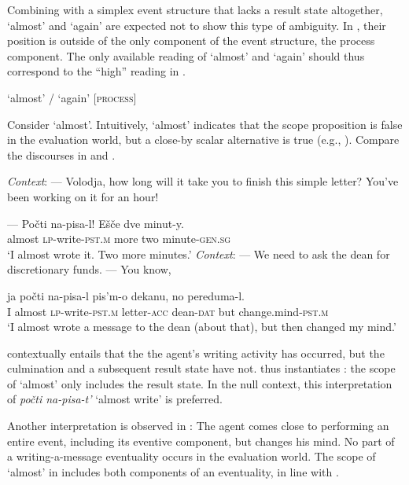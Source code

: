 \documentclass[output=paper,colorlinks,citecolor=brown]{langscibook}
\begin{document}
\noindent Combining with a simplex event structure that lacks a result state altogether, ‘almost’ and ‘again’ are expected not to show this type of ambiguity. In , their position is outside of the only component of the event structure, the process component. The only available reading of ‘almost’ and ‘again’ should thus correspond to the “high” reading in .

\ea    ‘almost’ / ‘again’ [\textsc{process}]\label{tat:ex:39}
\z

\noindent Consider ‘almost’. Intuitively, ‘almost’ indicates that the scope proposition is false in the evaluation world, but a close-by scalar alternative is true (e.g., \citealt{Penka2006}). Compare the discourses in  and .

\ea\label{tat:ex:40}
\eanoraggedright  \textit{Context}: — Volodja, how long will it take you to finish this simple letter? You’ve been working on it for an hour!\label{ex:tatevosov:40a}

\gll   —  Počti na-pisa-l!  Ešče  dve  minut-y.\\
    {} almost  \textsc{lp}-write-\textsc{pst.m}  more  two  minute-\textsc{gen.sg}\\
\glt  ‘I almost wrote it. Two more minutes.’
\ex     \textit{Context}: — We need to ask the dean for discretionary funds. — You know,

\gll    ja  počti na-pisa-l  pis’m-o  dekanu,  no pereduma-l.\\
    I  almost   \textsc{lp}-write-\textsc{pst.m}  letter-\textsc{acc}   dean-\textsc{dat}    but change.mind-\textsc{pst.m}\\
\glt  ‘I almost wrote a message to the dean (about that), but then changed my mind.’\label{ex:tatevosov:40b}
\z
\z

\noindent {} contextually entails that the the agent’s writing activity has occurred, but the culmination and a subsequent result state have not.  thus instantiates : the  scope of ‘almost’ only includes the result state. In the null context, this interpretation of \textit{počti na-pisa-t’} ‘almost write’ is preferred.

Another interpretation is observed in : The agent comes close to performing an entire event, including its eventive component, but changes his mind. No part of a writing-a-message eventuality occurs in the evaluation world. The scope of ‘almost’ in  includes both components of an eventuality, in line with .
\end{document}
